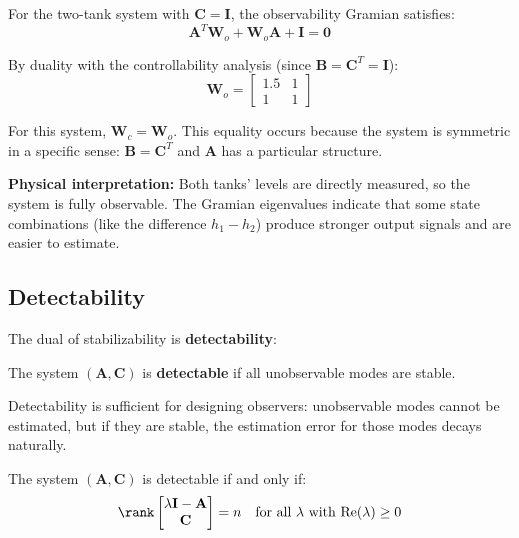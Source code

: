 \begin{example}
\label{ex:two_tank_obs_gramian}
For the two-tank system with $\mathbf{C} = \mathbf{I}$, the observability Gramian satisfies:
\begin{equation}
\mathbf{A}^T\mathbf{W}_o + \mathbf{W}_o\mathbf{A} + \mathbf{I} = \mathbf{0}
\end{equation}

By duality with the controllability analysis (since $\mathbf{B} = \mathbf{C}^T = \mathbf{I}$):
\begin{equation}
\mathbf{W}_o = \begin{bmatrix} 1.5 & 1 \\ 1 & 1 \end{bmatrix}
\end{equation}

For this system, $\mathbf{W}_c = \mathbf{W}_o$. This equality occurs because the system is symmetric in a specific sense: $\mathbf{B} = \mathbf{C}^T$ and $\mathbf{A}$ has a particular structure.

\textbf{Physical interpretation:} Both tanks' levels are directly measured, so the system is fully observable. The Gramian eigenvalues indicate that some state combinations (like the difference $h_1 - h_2$) produce stronger output signals and are easier to estimate.
\end{example}

\subsection{Detectability}

The dual of stabilizability is \textbf{detectability}:

\begin{definition}[Detectability]
The system $(\mathbf{A}, \mathbf{C})$ is \textbf{detectable} if all unobservable modes are stable.
\end{definition}

Detectability is sufficient for designing observers: unobservable modes cannot be estimated, but if they are stable, the estimation error for those modes decays naturally.

\begin{theorem}
The system $(\mathbf{A}, \mathbf{C})$ is detectable if and only if:
\begin{equation}
\rank\begin{bmatrix} \lambda\mathbf{I} - \mathbf{A} \\ \mathbf{C} \end{bmatrix} = n \quad \text{for all } \lambda \text{ with } \text{Re}(\lambda) \geq 0
\end{equation}
\end{theorem}


